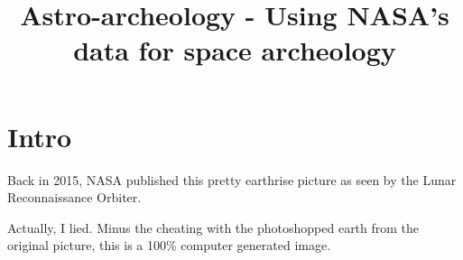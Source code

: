 \documentclass[14pt]{article}
\title{Astro-archeology - Using NASA's data for space archeology}
\begin{document}
\date{}
\maketitle

\section*{Intro}

Back in 2015, NASA published this pretty earthrise picture as seen by the Lunar Reconnaissance Orbiter.
\begin{figure}[H]
  \centering
  \label{img:lro_render_tweaked_photoshop}
\end{figure}

Actually, I lied. Minus the cheating with the photoshopped earth from the original picture, this is a 100\% computer generated image.
\end{document}
